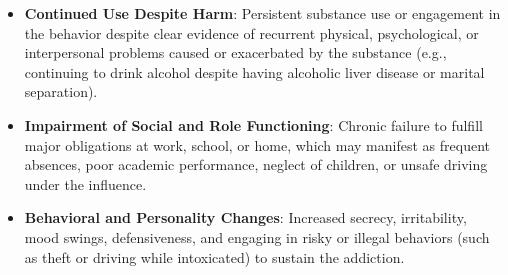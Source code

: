 \begin{itemize}
    \item \textbf{Continued Use Despite Harm}: Persistent substance use or engagement in the behavior despite clear evidence of recurrent physical, psychological, or interpersonal problems caused or exacerbated by the substance (e.g., continuing to drink alcohol despite having alcoholic liver disease or marital separation).
    \item \textbf{Impairment of Social and Role Functioning}: Chronic failure to fulfill major obligations at work, school, or home, which may manifest as frequent absences, poor academic performance, neglect of children, or unsafe driving under the influence.
    \item \textbf{Behavioral and Personality Changes}: Increased secrecy, irritability, mood swings, defensiveness, and engaging in risky or illegal behaviors (such as theft or driving while intoxicated) to sustain the addiction.
\end{itemize}

